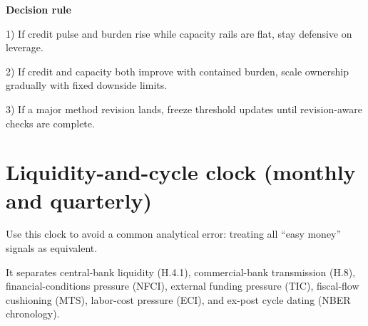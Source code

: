 \documentclass[11pt,openany]{book}
\begin{document}
\begin{notebox}
\textbf{Decision rule}\par
1) If credit pulse and burden rise while capacity rails are flat, stay defensive on leverage.\par
2) If credit and capacity both improve with contained burden, scale ownership gradually with fixed downside limits.\par
3) If a major method revision lands, freeze threshold updates until revision-aware checks are complete.
\end{notebox}

\section{Liquidity-and-cycle clock (monthly and quarterly)}

Use this clock to avoid a common analytical error: treating all ``easy money'' signals as equivalent.

It separates central-bank liquidity (H.4.1), commercial-bank transmission (H.8), financial-conditions pressure (NFCI), external funding pressure (TIC), fiscal-flow cushioning (MTS), labor-cost pressure (ECI), and ex-post cycle dating (NBER chronology).
\end{document}
